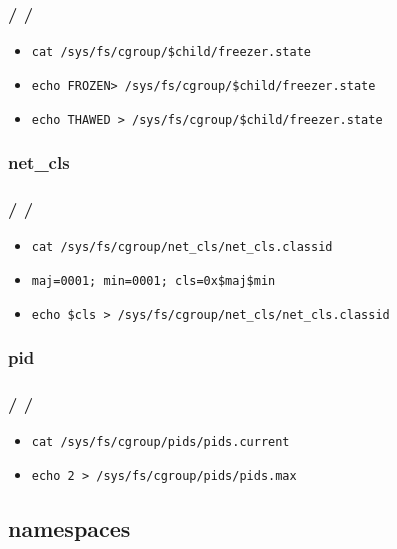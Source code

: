 \documentclass{beamer}
\newcommand{\autotitle}
{\frametitle{
    \secname
    \ifx\insertsubsection\empty
    \else
        /\subsecname
        \ifx\insertsubsubsection\empty\else/\subsubsecname\fi
    \fi}}
\begin{document}
\begin{frame}[fragile]
    \autotitle
    \begin{itemize}
        \item \verb|cat /sys/fs/cgroup/$child/freezer.state|
        \item \verb|echo FROZEN> /sys/fs/cgroup/$child/freezer.state|
        \item \verb|echo THAWED > /sys/fs/cgroup/$child/freezer.state|
    \end{itemize}
\end{frame}

\subsubsection{net\_cls}

\begin{frame}[fragile]
    \autotitle
    \begin{itemize}
        \item \verb|cat /sys/fs/cgroup/net_cls/net_cls.classid|
        \item \verb|maj=0001; min=0001; cls=0x$maj$min|
        \item \verb|echo $cls > /sys/fs/cgroup/net_cls/net_cls.classid|
    \end{itemize}
\end{frame}

\subsubsection{pid}

\begin{frame}[fragile]
    \autotitle
    \begin{itemize}
        \item \verb|cat /sys/fs/cgroup/pids/pids.current|
        \item \verb|echo 2 > /sys/fs/cgroup/pids/pids.max|
    \end{itemize}
\end{frame}

\subsection{namespaces}
\end{document}
